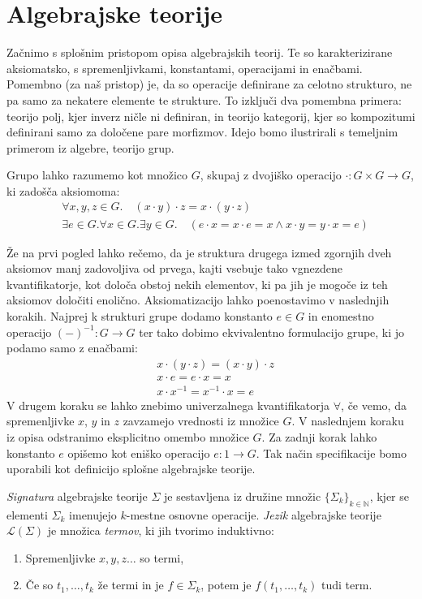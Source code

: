 \documentclass[../kategoricna_logika.tex]{subfiles}
\begin{document}
\section{Algebrajske teorije}
Začnimo s splošnim pristopom opisa algebrajskih teorij.
Te so karakterizirane aksiomatsko, s spremenljivkami, konstantami, operacijami in enačbami.
Pomembno (za naš pristop) je, da so operacije definirane za celotno strukturo,
ne pa samo za nekatere elemente te strukture.
To izključi dva pomembna primera: teorijo polj,
kjer inverz ničle ni definiran, in teorijo kategorij, kjer so kompozitumi
definirani samo za določene pare morfizmov.
Idejo bomo ilustrirali s temeljnim primerom iz algebre, teorijo grup.
\begin{primer}
  \label{primer:teorija-grup}
  Grupo lahko razumemo kot množico $G$, skupaj z dvojiško operacijo
  $\cdot : G \times G \to G$, ki zadošča aksiomoma:
  \begin{align}\label{aksiomi-grupe}
    &\forall x,y,z \in G . \quad (x\cdot y) \cdot z = x \cdot (y \cdot z) \\
    &\exists e \in G . \forall x \in G . \exists y \in G . \quad (e \cdot x = x \cdot e = x \wedge x \cdot y = y \cdot x = e)
  \end{align}
\end{primer}
\noindent
Že na prvi pogled lahko rečemo, da je struktura drugega izmed zgornjih dveh aksiomov
manj zadovoljiva od prvega, kajti vsebuje tako vgnezdene kvantifikatorje,
kot določa obstoj nekih elementov, ki pa jih je mogoče iz teh aksiomov
določiti enolično. Aksiomatizacijo lahko poenostavimo v naslednjih korakih.
Najprej k strukturi grupe dodamo
konstanto $e \in G$ in enomestno operacijo $(-)^{-1} : G \to G$ ter tako
dobimo ekvivalentno formulacijo grupe, ki jo podamo samo z enačbami:
\begin{align*}
  &x \cdot (y \cdot z) = (x \cdot y) \cdot z \\
  &x \cdot e = e \cdot x = x \\
  &x \cdot x^{-1} = x^{-1} \cdot x = e
\end{align*}
V drugem koraku se lahko znebimo univerzalnega kvantifikatorja $\forall$,
če vemo, da spremenljivke $x$, $y$ in $z$ zavzamejo vrednosti iz množice $G$.
V naslednjem koraku iz opisa odstranimo eksplicitno omembo množice $G$.
Za zadnji korak lahko konstanto $e$ opišemo kot eniško operacijo $e : 1 \to G$.
Tak način specifikacije bomo uporabili kot definicijo splošne algebrajske teorije.
%
\begin{definicija}
  \emph{Signatura} algebrajske teorije $\Sigma$ je sestavljena iz družine
  množic $\lbrace \Sigma_k \rbrace_{k \in \mathbb{N}}$, kjer se elementi $\Sigma_k$
  imenujejo $k$-mestne osnovne operacije.
  \emph{Jezik} algebrajske teorije $\mathcal{L}(\Sigma)$ je množica \emph{termov},
  ki jih tvorimo induktivno:
  \begin{enumerate}
  \item Spremenljivke $x,y,z \ldots$ so termi,
  \item Če so $t_1, \ldots, t_k$ že termi in je $f \in \Sigma_k$, potem
    je $f(t_1,\ldots, t_k)$ tudi term.
  \end{enumerate}
\end{definicija}
\end{document}
